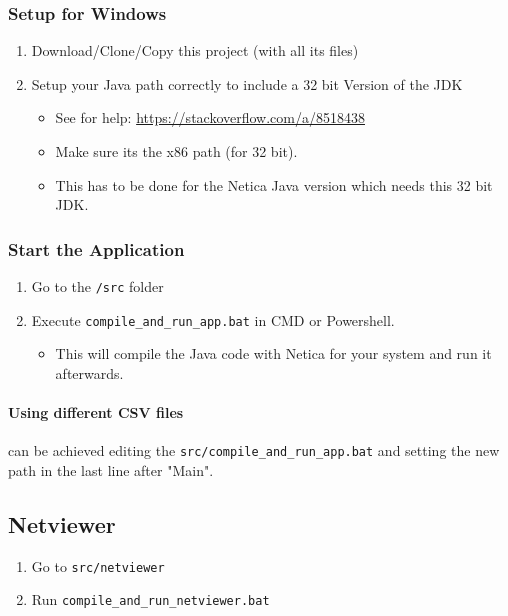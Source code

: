 \documentclass[12pt]{scrartcl}
\begin{document}
\subsubsection{Setup for Windows}
\begin{enumerate}
    \item Download/Clone/Copy this project (with all its files)
    \item Setup your Java path correctly to include a 32 bit Version of the JDK
    \begin{itemize}
        \item See for help: \url{https://stackoverflow.com/a/8518438}
        \item Make sure its the x86 path (for 32 bit).
        \item This has to be done for the Netica Java version which needs this 32 bit JDK.
    \end{itemize}
\end{enumerate}

\subsubsection{Start the Application}
\begin{enumerate}
    \item Go to the \texttt{/src} folder
    \item Execute \texttt{compile_and_run_app.bat} in CMD or Powershell.
    \begin{itemize}
        \item This will compile the Java code with Netica for your system and run it afterwards.
    \end{itemize}
\end{enumerate}

\paragraph{Using different CSV files} can be achieved editing the \texttt{src/compile_and_run_app.bat} and setting the new path in the last line after "Main".

\subsection{Netviewer}
\label{sec:netviewer}
\begin{enumerate}
    \item Go to \texttt{src/netviewer}
    \item Run \texttt{compile_and_run_netviewer.bat}
\end{enumerate}
\end{document}
